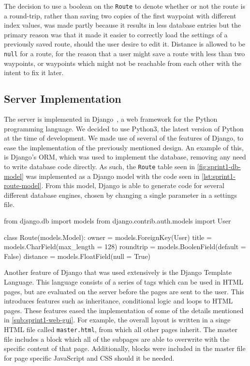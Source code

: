 The decision to use a boolean on the \texttt{Route} to denote whether or not the route is a round-trip, rather than saving two copies of the first waypoint with different index values, was made partly because it results in less database entries but the primary reason was that it made it easier to correctly load the settings of a previously saved route, should the user desire to edit it. Distance is allowed to be \texttt{null} for a route, for the reason that a user might save a route with less than two waypoints, or waypoints which might not be reachable from each other with the intent to fix it later.

\subsection{Server Implementation}

The server is implemented in Django~\citep{djangoproject}, a web framework for the Python programming language. We decided to use Python3, the latest version of Python at the time of development. We made use of several of the features of Django, to ease the implementation of the previously mentioned design. An example of this, is Django's \ac{ORM}, which was used to implement the database, removing any need to write database code directly. As such, the \texttt{Route} table seen in \autoref{fig:sprint1-db-model} was implemented as a Django model with the code seen in \autoref{lst:sprint1-route-model}. From this model, Django is able to generate code for several different database engines, chosen by changing a single parameter in a settings file.

\begin{code}[language={Python}, label={lst:sprint1-route-model}, caption={The \texttt{Route} Model}]
from django.db import models
from django.contrib.auth.models import User

class Route(models.Model):
	owner = models.ForeignKey(User)
	title = models.CharField(max_length = 128)
	roundtrip = models.BoolenField(default = False)
	distance = models.FloatField(null = True)
\end{code}

Another feature of Django that was used extensively is the Django Template Language. This language consists of a series of tags which can be used in \ac{HTML} pages, but are evaluated on the server before the pages are sent to the user. This introduces features such as inheritance, conditional logic and loops to \ac{HTML} pages. These features eased the implementation of some of the details mentioned in \autoref{sub:sprint1-web-gui}. For example, the overall layout is written in a singe \ac{HTML} file called \texttt{master.html}, from which all other pages inherit. The master file includes a block which all of the subpages are able to overwrite with the specific content of that page. Additionally, blocks were included in the master file for page specific JavaScript and \ac{CSS} should it be needed.

